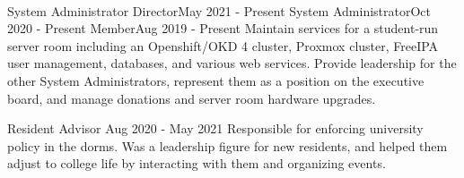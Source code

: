 \vspace{1.5pt} %


\medskip
\\



    {System Administrator Director}{May 2021 - Present}
    {System Administrator}{Oct 2020 - Present}
    {Member}{Aug 2019 - Present}
    {Maintain services for a student-run server room including an Openshift/OKD 4 cluster, Proxmox cluster, FreeIPA user management, databases, and various web services. Provide leadership for the other System Administrators, represent them as a position on the executive board, and manage donations and server room hardware upgrades.}

    {Resident Advisor} {Aug 2020 - May 2021}
    {Responsible for enforcing university policy in the dorms. Was a leadership figure for new residents, and helped them adjust to college life by interacting with them and organizing events.}